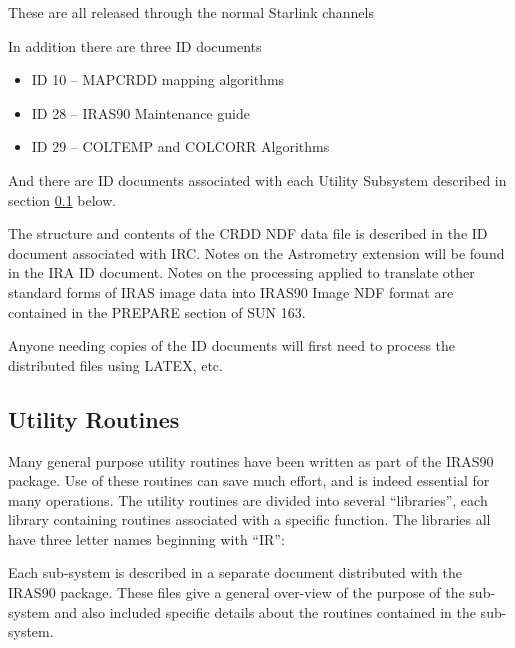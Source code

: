 These are all released through the normal Starlink channels

In addition there are three ID documents

\begin{itemize}

\item ID 10 -- MAPCRDD mapping algorithms
 
\item ID 28 -- IRAS90 Maintenance guide

\item ID 29 -- COLTEMP and COLCORR Algorithms

\end{itemize}

And there are ID documents associated with each Utility Subsystem described in
section \ref{SEC:UTIL} below.

The structure and contents of the CRDD NDF data file is described in the ID
document associated with IRC. Notes on the Astrometry extension will be found
in the IRA ID document. Notes on the processing applied to translate other 
standard forms of IRAS image data into IRAS90 Image NDF format are contained
in the PREPARE section of SUN 163.

Anyone needing copies of the ID documents will first need to process the 
distributed files using {\small LATEX}, etc. 


\subsection{Utility Routines}
\label{SEC:UTIL}

Many general purpose utility routines have been written as part of the
{\small IRAS90} package. Use of these routines can save much effort,
and is indeed essential for many operations. The utility routines are
divided into several ``libraries'', each library containing routines
associated with a specific function. The libraries all have three
letter names beginning with ``IR'':

Each sub-system is described in a separate document distributed with
the {\small IRAS90} package. These files give a
general over-view of the purpose of the sub-system and also included
specific details about the routines contained in the sub-system. 

